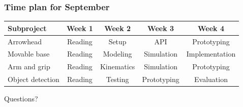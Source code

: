 \documentclass{beamer}
\begin{document}
\begin{frame}
    \frametitle{Time plan for September}
    \begin{table}
        \begin{tabular}{l | c | c | c | c }
        Subproject & Week 1 & Week 2 & Week 3 & Week 4 \\
        \hline \hline
            Arrowhead & Reading& Setup & API & Prototyping\\
            Movable base & Reading& Modeling & Simulation & Implementation\\
            Arm and grip  & Reading & Kinematics & Simulation& Prototyping\\
            Object detection & Reading & Testing & Prototyping & Evaluation\\
        \end{tabular}
    \end{table}
\end{frame}


\begin{frame}
    \begin{center}
        \Huge Questions?
    \end{center}
\end{frame}
\end{document}
